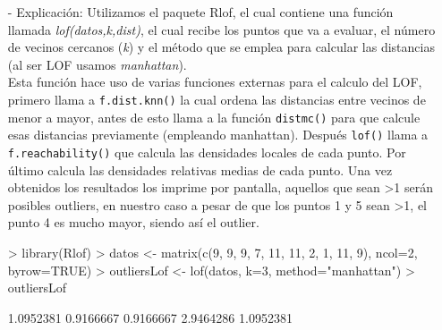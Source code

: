 \documentclass[a4paper, 12pt]{article}
\begin{document}
\begin{itemize}
\begin{itemize}
				\item[-] Explicación: Utilizamos el paquete Rlof, el cual contiene una función llamada \emph{lof(datos,k,dist)}, el cual recibe los puntos que va a evaluar, el número de vecinos cercanos (\emph{k}) y el método que se emplea para calcular las distancias (al ser LOF usamos \emph{manhattan}). \\
				Esta función hace uso de varias funciones externas para el calculo del LOF, primero llama a \texttt{f.dist.knn()} la cual ordena las distancias entre vecinos de menor a mayor, antes de esto llama a la función \texttt{distmc()} para que calcule esas distancias previamente (empleando manhattan). Después \texttt{lof()} llama a \texttt{f.reachability()} que calcula las densidades locales de cada punto. Por último calcula las densidades relativas medias de cada punto. Una vez obtenidos los resultados los imprime por pantalla, aquellos que sean >1 serán posibles outliers, en nuestro caso a pesar de que los puntos 1 y 5 sean >1, el punto 4 es mucho mayor, siendo así el outlier.\\ 
\begin{Schunk}
\begin{Sinput}
> library(Rlof)
> datos <- matrix(c(9, 9, 9, 7, 11, 11, 2, 1, 11, 9), ncol=2, byrow=TRUE)
> outliersLof <- lof(datos, k=3, method="manhattan")
> outliersLof
\end{Sinput}
\begin{Soutput}
[1] 1.0952381 0.9166667 0.9166667 2.9464286 1.0952381
\end{Soutput}
\end{Schunk}
			\end{itemize}
		\end{itemize}   
	
\end{document}
